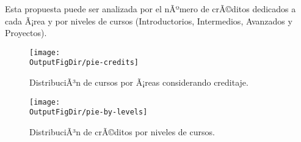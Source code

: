 Esta propuesta puede ser analizada por el nÃºmero de crÃ©ditos dedicados a cada Ã¡rea
y por niveles de cursos (Introductorios, Intermedios, Avanzados y Proyectos).
\vspace{0.5cm}
 
\begin{figure}[h!]
      \centering
      \texttt{[image: \\OutputFigDir/pie-credits]}
      \label{fig:pie-credits}
      \caption{DistribuciÃ³n de cursos por Ã¡reas considerando creditaje.}
\end{figure}

% 


\begin{figure}[h!]
      \centering
      \texttt{[image: \\OutputFigDir/pie-by-levels]}
      \label{fig:pie-niveles}
      \caption{DistribuciÃ³n de crÃ©ditos por niveles de cursos.}
\end{figure}